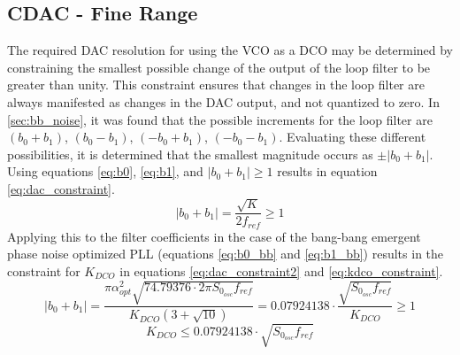 	\FloatBarrier
	\subsection{CDAC - Fine Range}
	The required DAC resolution for using the VCO as a DCO may be determined by constraining the smallest possible change of the output of the loop filter to be greater than unity. This constraint ensures that changes in the loop filter are always manifested as changes in the DAC output, and not quantized to zero. In \ref{sec:bb_noise}, it was found that the possible increments for the loop filter are $(b_0+b_1 )$, $( b_0-b_1 )$, $( -b_0+b_1 )$, $( -b_0-b_1 )$. Evaluating these different possibilities, it is determined that the smallest magnitude occurs as $\pm|b_0+b_1|$. Using equations \ref{eq:b0}, \ref{eq:b1}, and  $|b_0+b_1| \geq 1$ results in equation \ref{eq:dac_constraint}.
	\begin{equation}\label{eq:dac_constraint}
		|b_0+b_1| = \frac{\sqrt{K}}{2f_{ref}} \geq 1
	\end{equation}
	Applying this to the filter coefficients in the case of the bang-bang emergent phase noise optimized PLL (equations \ref{eq:b0_bb} and \ref{eq:b1_bb}) results in the constraint for $K_{DCO}$ in equations  \ref{eq:dac_constraint2} and \ref{eq:kdco_constraint}.
	\begin{equation}\label{eq:dac_constraint2}
		|b_0+b_1| = \frac{\pi\alpha_{opt}^2\sqrt{74.79376\cdot2\pi S_{0_{osc}} f_{ref}}}{K_{DCO}(3+\sqrt{10})} = 0.07924138\cdot \frac{ \sqrt{S_{0_{osc}} f_{ref}}}{K_{DCO}} \geq 1
	\end{equation}
	\begin{equation}\label{eq:kdco_constraint}
		K_{DCO} \leq 0.07924138\cdot \sqrt{S_{0_{osc}} f_{ref}}
	\end{equation}

